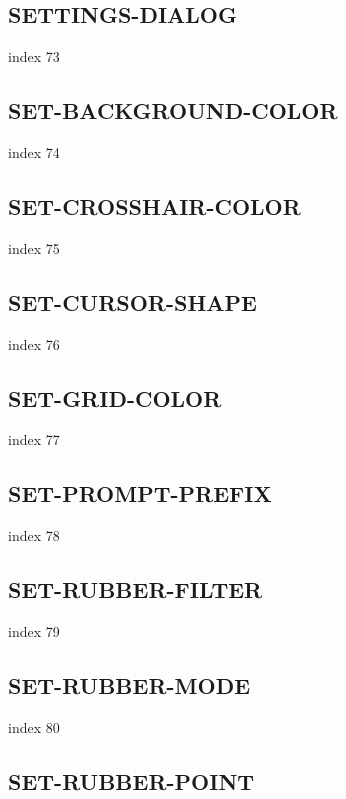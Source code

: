 \documentclass[a4paper]{report}
\begin{document}
\subsection{SETTINGS-DIALOG}

index 73

\subsection{SET-BACKGROUND-COLOR}

index 74

\subsection{SET-CROSSHAIR-COLOR}

index 75

\subsection{SET-CURSOR-SHAPE}

index 76

\subsection{SET-GRID-COLOR}

index 77

\subsection{SET-PROMPT-PREFIX}

index 78

\subsection{SET-RUBBER-FILTER}

index 79

\subsection{SET-RUBBER-MODE}

index 80

\subsection{SET-RUBBER-POINT}
\end{document}
